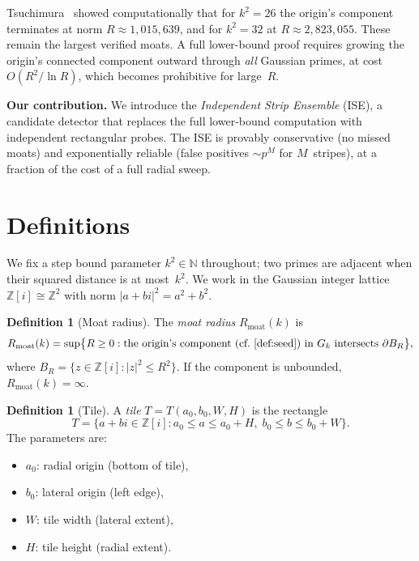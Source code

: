 \documentclass[11pt,a4paper]{article}
\theoremstyle{definition}
\newtheorem{definition}[theorem]{Definition}
\theoremstyle{remark}
\newcommand{\Zi}{\mathbb{Z}[i]}
\newcommand{\N}{\mathbb{N}}
\begin{document}
Tsuchimura~\cite{tsuchimura2005} showed computationally that for
$k^2 = 26$ the origin's component terminates at norm
$R \approx 1{,}015{,}639$, and for $k^2 = 32$ at
$R \approx 2{,}823{,}055$.  These remain the largest
verified moats.  A full lower-bound proof requires growing the origin's
connected component outward through \emph{all} Gaussian primes, at cost
$O(R^2 / \!\ln R)$, which becomes prohibitive for large~$R$.

\medskip
\noindent\textbf{Our contribution.}\enspace
We introduce the \emph{Independent Strip Ensemble} (ISE), a candidate
detector that replaces the full lower-bound computation with
independent rectangular probes.  The ISE is provably conservative
(no missed moats) and exponentially reliable (false positives
$\sim p^M$ for $M$~stripes), at a fraction of the cost of a full
radial sweep.

\section{Definitions}\label{sec:defs}

We fix a step bound parameter $k^2 \in \N$ throughout; two primes
are adjacent when their squared distance is at most~$k^2$.
We work in the Gaussian integer lattice
$\Zi \cong \mathbb{Z}^2$ with norm $|a + bi|^2 = a^2 + b^2$.

\begin{definition}[Moat radius]
The \emph{moat radius} $R_{\mathrm{moat}}(k)$ is
\[
  R_{\mathrm{moat}}(k) = \sup\bigl\{R \ge 0 :
    \text{the origin's component (cf.\ \Cref{def:seed}) in } G_k
    \text{ intersects } \partial B_R\bigr\},
\]
where $B_R = \{z \in \Zi : |z|^2 \le R^2\}$.  If the component is
unbounded, $R_{\mathrm{moat}}(k) = \infty$.
\end{definition}

\begin{definition}[Tile]\label{def:tile}
A \emph{tile} $T = T(a_0, b_0, W, H)$ is the rectangle
\[
  T = \bigl\{a + bi \in \Zi : a_0 \le a \le a_0 + H,\;
      b_0 \le b \le b_0 + W\bigr\}.
\]
The parameters are:
\begin{itemize}
  \item $a_0$: radial origin (bottom of tile),
  \item $b_0$: lateral origin (left edge),
  \item $W$: tile width (lateral extent),
  \item $H$: tile height (radial extent).
\end{itemize}
\end{definition}
\end{document}
